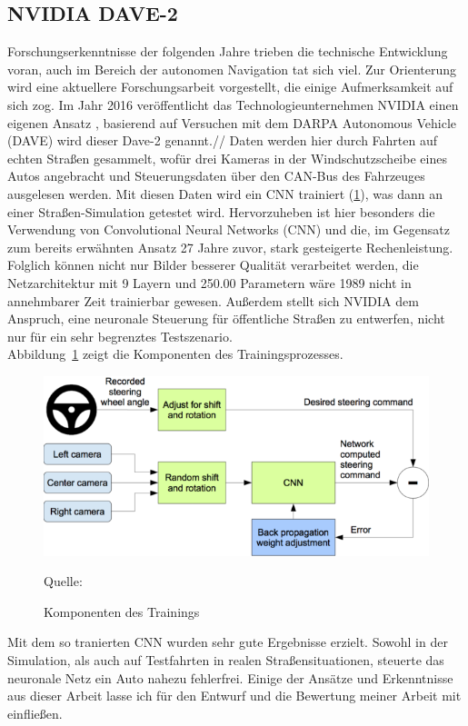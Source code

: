 \subsection{NVIDIA DAVE-2}

Forschungserkenntnisse der folgenden Jahre trieben die technische Entwicklung voran, auch im Bereich der autonomen Navigation tat sich viel. Zur Orienterung wird eine aktuellere Forschungsarbeit vorgestellt, die einige Aufmerksamkeit auf sich zog.
Im Jahr 2016 veröffentlicht das Technologieunternehmen \textsc{NVIDIA} einen eigenen Ansatz \cite{bojarski2016end}, basierend auf Versuchen mit dem \glqq DARPA Autonomous Vehicle \grqq{} (DAVE)  wird dieser \glqq Dave-2 \grqq{} genannt.//
Daten werden hier durch Fahrten auf echten Straßen gesammelt, wofür drei Kameras in der Windschutzscheibe eines Autos angebracht und Steuerungsdaten über den CAN-Bus des Fahrzeuges ausgelesen werden. Mit diesen Daten wird ein CNN trainiert (\ref{img:NVIDIA}), was dann an einer Straßen-Simulation getestet wird. Hervorzuheben ist hier besonders die Verwendung von Convolutional Neural Networks (CNN) und die, im Gegensatz zum bereits erwähnten Ansatz 27 Jahre zuvor, stark gesteigerte Rechenleistung. Folglich können nicht nur Bilder besserer Qualität verarbeitet werden, die Netzarchitektur mit 9 Layern und 250.00 Parametern wäre 1989 nicht in annehmbarer Zeit trainierbar gewesen. Außerdem stellt sich NVIDIA dem Anspruch, eine neuronale Steuerung für öffentliche Straßen zu entwerfen, nicht nur für ein sehr begrenztes Testszenario.\\
Abbildung~\ref{img:NVIDIA} zeigt die Komponenten des Trainingsprozesses. 

\begin{figure}[h]
	\centering
	\includegraphics[scale=0.6]{figures/NVIDIA-Training.png}
	\caption{Komponenten des Trainings}
	Quelle: 
	\label{img:NVIDIA}
\end{figure}

Mit dem so tranierten CNN wurden sehr gute Ergebnisse erzielt. Sowohl in der Simulation, als auch auf Testfahrten in realen Straßensituationen, steuerte das neuronale Netz ein Auto nahezu fehlerfrei.
Einige der Ansätze und Erkenntnisse aus dieser Arbeit lasse ich für den Entwurf und die Bewertung meiner Arbeit mit einfließen.



